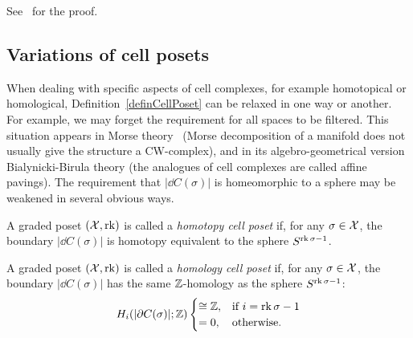 See~\cite[Prop.3.1]{bjorner1984poset} for the proof.
%
%


\subsection{Variations of cell posets}\label{subsecMathCellVariations}

When dealing with specific aspects of cell complexes, for example homotopical or homological, Definition~\ref{definCellPoset} can be relaxed in one way or another. For example, we may forget the requirement for all spaces to be filtered. This situation appears in Morse theory~\cite{MilnorMorse} (Morse decomposition of a manifold does not usually give the structure a CW-complex), and in its algebro-geometrical version Bialynicki-Birula theory \cite{BialynizkiDecomp} (the analogues of cell complexes are called affine pavings). The requirement that $|\dd C(\sigma)|$ is homeomorphic to a sphere may be weakened in several obvious ways.

\begin{defin}\label{definHomotopyCellPoset}
A graded poset $(\mathcal{X},\operatorname{rk})$ is called a \emph{homotopy cell poset} if, for any $\sigma\in \mathcal{X}$, the boundary $|\dd C(\sigma)|$ is homotopy equivalent to the sphere $S^{\operatorname{rk}\sigma-1}$.
\end{defin}

\begin{defin}\label{definHomologyCellPoset}
A graded poset $(\mathcal{X},\operatorname{rk})$ is called a \emph{homology cell poset} if, for any $\sigma\in \mathcal{X}$, the boundary $|\dd C(\sigma)|$ has the same $\mathbb{Z}$-homology as the sphere $S^{\operatorname{rk}\sigma-1}$:
\[
H_i(|\partial C(\sigma)|;\mathbb{Z})\begin{cases}
                          \cong\mathbb{Z}, & \mbox{if } i=\operatorname{rk}\sigma-1 \\
                          =0, & \mbox{otherwise}.
                        \end{cases}
\]
\end{defin}

